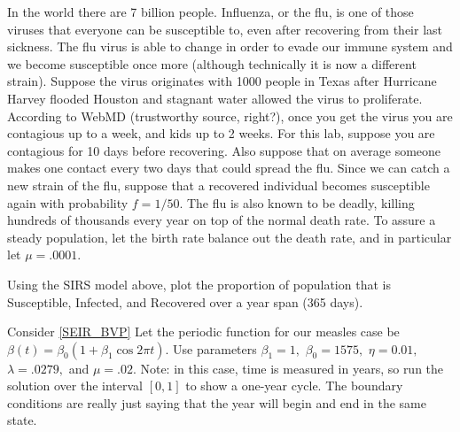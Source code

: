 In the world there are 7 billion people.
Influenza, or the flu, is one of those viruses that everyone can be susceptible to, even after recovering from their last sickness.
The flu virus is able to change in order to evade our immune system and we become susceptible once more (although technically it is now a different strain).
Suppose the virus originates with 1000 people in Texas after Hurricane Harvey flooded Houston and stagnant water allowed the virus to proliferate.
According to WebMD (trustworthy source, right?), once you get the virus you are contagious up to a week, and kids up to 2 weeks.
For this lab, suppose you are contagious for 10 days before recovering.
Also suppose that on average someone makes one contact every two days that could spread the flu.
Since we can catch a new strain of the flu, suppose that a recovered individual becomes susceptible again with probability $f=1/50$.
The flu is also known to be deadly, killing hundreds of thousands every year on top of the normal death rate.
To assure a steady population, let the birth rate balance out the death rate, and in particular let $\mu=.0001$.

Using the SIRS model above, plot the proportion of population that is Susceptible, Infected, and Recovered over a year span (365 days).

Consider \eqref{SEIR_BVP}
Let the periodic function for our measles case be $\beta(t) = \beta_0(1 + \beta_1 \cos{2\pi t})$.
Use parameters $\beta_1 = 1,$ $\beta_0 = 1575,$ $\eta = 0.01,$ $\lambda = .0279,$ and $\mu = .02.$
Note: in this case, time is measured in years, so run the solution over the interval $\left[0, 1\right]$ to show a one-year cycle.
The boundary conditions are really just saying that the year will begin and end in the same state.

